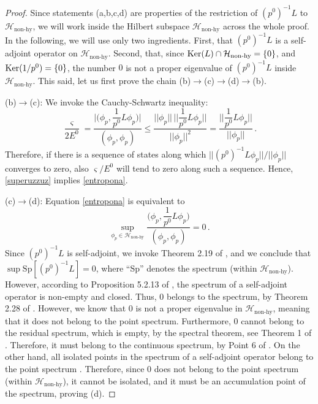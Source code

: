 \documentclass[a4paper, amsfonts, amssymb, amsmath, reprint, showkeys, nofootinbib, twoside, onecolumn,notitlepage,,longbibliography]{revtex4-2}
\theoremstyle{definition}
\theoremstyle{theorem}
\theoremstyle{corollary}
\begin{document}
\begin{proof}
Since statements (a,b,c,d) are properties of the restriction of $(p^0)^{-1}L$ to $\mathcal{H}_{\text{non-hy}}$, we will work inside the Hilbert subspace $\mathcal{H}_{\text{non-hy}}$ across the whole proof.  In the following, we will use only two ingredients. First, that $(p^0)^{-1}L$ is a self-adjoint operator on $\mathcal{H}_{\text{non-hy}}$. Second, that, since $\textup{Ker}(L)\cap \mathcal{H}_{\text{non-hy}}=\{ 0 \}$, and $\textup{Ker}(1/p^0)=\{ 0\}$, the number $0$ is not a proper eigenvalue of $(p^0)^{-1}L$ inside $\mathcal{H}_{\text{non-hy}}$.
This said, let us first prove the chain (b)$\rightarrow$(c)$\rightarrow$(d)$\rightarrow$(b). 

\noindent (b)$\rightarrow$(c): We invoke the Cauchy-Schwartz inequality:
\begin{equation}
 \dfrac{\varsigma}{2E^0} = \dfrac{\bigg| \bigg(\phi_p , \dfrac{1}{p^0}L \phi_p \bigg) \bigg|}{(\phi_p,\phi_p)} \leq  \dfrac{|| \phi_p || \, \bigg| \bigg|  \dfrac{1}{p^0}L \phi_p  \bigg| \bigg|}{|| \phi_p ||^2} = \dfrac{ \bigg| \bigg|  \dfrac{1}{p^0}L \phi_p  \bigg| \bigg|}{|| \phi_p ||} \, .
\end{equation}
Therefore, if there is a sequence of states along which $||(p^0)^{-1}L\phi_p ||/||\phi_p||$ converges to zero, also $\varsigma/E^0$ will tend to zero along such a sequence. Hence, \eqref{superuzzuz} implies \eqref{entropona}.

\noindent (c)$\rightarrow$(d): Equation \eqref{entropona} is equivalent to
\begin{equation}
\sup_{\phi_p \in \mathcal{H}_{\text{non-hy}}}  \dfrac{\bigg(\phi_p , \dfrac{1}{p^0}L \phi_p \bigg) }{(\phi_p,\phi_p)} =0 \, . 
\end{equation}
Since $(p^0)^{-1}L$ is self-adjoint, we invoke Theorem 2.19 of \cite[Chapter 2, \S 2.4]{Teschlbook}, and we conclude that $\sup \text{Sp}[(p^0)^{-1}L]{=}0$, where ``Sp'' denotes the spectrum (within $\mathcal{H}_{\text{non-hy}}$). However, according to Proposition 5.2.13 of \cite[Chapter 5, \S 5.2]{Pedersenbook}, the spectrum of a self-adjoint operator is non-empty and closed. Thus, $0$ belongs to the spectrum, by Theorem 2.28 of \cite[Chapter 2]{RudinAnalysis_book}. However, we know that $0$ is not a proper eigenvalue in $\mathcal{H}_{\text{non-hy}}$, meaning that it does not belong to the point spectrum. Furthermore, $0$ cannot belong to the residual spectrum,  which is empty, by the spectral theorem, see Theorem 1 of \cite[Lecture 18]{Bhatiabook}. Therefore, it must belong to the continuous spectrum, by Point 6 of \cite[Lecture 17]{Bhatiabook}. On the other hand, all isolated points in the spectrum of a self-adjoint operator belong to the point spectrum \cite[Chapter 5, \S 3.5]{Kato_book}. Therefore, since $0$ does not belong to the point spectrum (within $\mathcal{H}_{\text{non-hy}}$), it cannot be isolated, and it must be an accumulation point of the spectrum, proving (d).


\end{proof}
\end{document}
